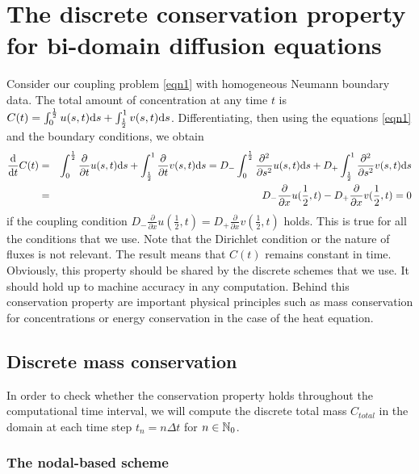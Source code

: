 %
%
\section{The discrete conservation property for bi-domain diffusion equations}
\label{sec:cons}
%
%

Consider our coupling problem \eqref{eqn1} with homogeneous Neumann boundary data.
The total amount of concentration at any time $t$ is $C(t) =\int_0^{\frac 12}u(s,t)\mbox{d} s+\int_{\frac 12}^1v(s,t)\mbox{d} s$.
Differentiating, then using the equations \eqref{eqn1} and the boundary conditions, we obtain
\begin{eqnarray*}
\frac {\mbox{d}}{\mbox{d} t} C(t) &=&\int_0^{\frac 12}\frac\partial{\partial t}u(s,t)\mbox{d} s+\int_{\frac 12}^1\frac\partial{\partial t}v(s,t)\mbox{d} s
=D_-\int_0^{\frac 12}\frac{\partial^2}{\partial s^2}u(s,t)\mbox{d} s+D_+\int_{\frac 12}^1\frac{\partial^2}{\partial s^2}v(s,t)\mbox{d} s\\
&=& D_- \frac{\partial}{\partial x}u(\frac 12,t) -D_+\frac{\partial}{\partial x}v(\frac 12,t) =0
\end{eqnarray*}
%
if the coupling condition $D_- \frac{\partial}{\partial x}u(\frac 12,t) =D_+\frac{\partial}{\partial x}v(\frac 12,t)$ holds.
This is true for all the conditions that we use. Note that the Dirichlet condition or the nature of fluxes is not relevant.
The result means that $C(t)$ remains constant in time. Obviously, this property should be shared by the discrete schemes that we use.
It should hold up to machine accuracy in any computation. Behind this conservation property are important physical principles such as
mass conservation for concentrations or energy conservation in the case of the heat equation.

%
%
\subsection{Discrete mass conservation}
%
%

In order to check whether the conservation property holds throughout the computational time interval, we will
compute the discrete total mass $C_{total}$ in the domain at each time step $t_n=n\Delta t$ for $n\in\mathbb{N}_0$.

%
%
\subsubsection*{The nodal-based scheme}
%
%

